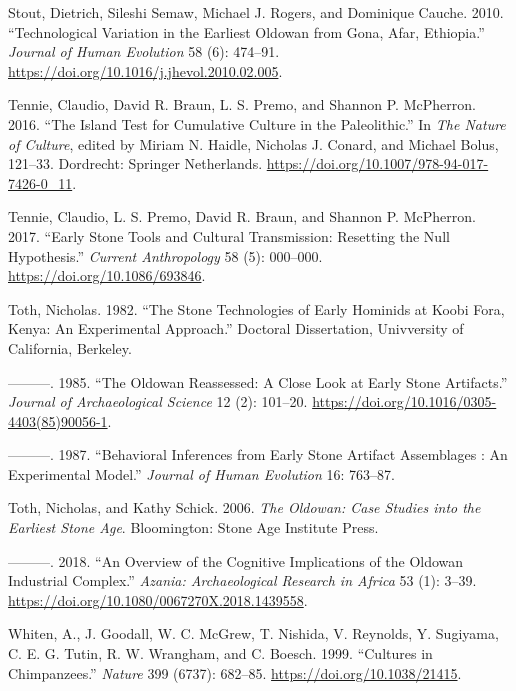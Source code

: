 \documentclass[]{elsarticle} %
\begin{document}
\leavevmode\hypertarget{ref-stoutTechnologicalVariationEarliest2010}{}%
Stout, Dietrich, Sileshi Semaw, Michael J. Rogers, and Dominique Cauche.
2010. ``Technological Variation in the Earliest Oldowan from Gona, Afar,
Ethiopia.'' \emph{Journal of Human Evolution} 58 (6): 474--91.
\url{https://doi.org/10.1016/j.jhevol.2010.02.005}.

\leavevmode\hypertarget{ref-tennieIslandTestCumulative2016}{}%
Tennie, Claudio, David R. Braun, L. S. Premo, and Shannon P. McPherron.
2016. ``The Island Test for Cumulative Culture in the Paleolithic.'' In
\emph{The Nature of Culture}, edited by Miriam N. Haidle, Nicholas J.
Conard, and Michael Bolus, 121--33. Dordrecht: Springer Netherlands.
\url{https://doi.org/10.1007/978-94-017-7426-0_11}.

\leavevmode\hypertarget{ref-tennieEarlyStoneTools2017}{}%
Tennie, Claudio, L. S. Premo, David R. Braun, and Shannon P. McPherron.
2017. ``Early Stone Tools and Cultural Transmission: Resetting the Null
Hypothesis.'' \emph{Current Anthropology} 58 (5): 000--000.
\url{https://doi.org/10.1086/693846}.

\leavevmode\hypertarget{ref-tothStoneTechnologiesEarly1982}{}%
Toth, Nicholas. 1982. ``The Stone Technologies of Early Hominids at
Koobi Fora, Kenya: An Experimental Approach.'' Doctoral Dissertation,
Univversity of California, Berkeley.

\leavevmode\hypertarget{ref-tothOldowanReassessedClose1985}{}%
---------. 1985. ``The Oldowan Reassessed: A Close Look at Early Stone
Artifacts.'' \emph{Journal of Archaeological Science} 12 (2): 101--20.
\url{https://doi.org/10.1016/0305-4403(85)90056-1}.

\leavevmode\hypertarget{ref-tothBehavioralInferencesEarly1987}{}%
---------. 1987. ``Behavioral Inferences from Early Stone Artifact
Assemblages : An Experimental Model.'' \emph{Journal of Human Evolution}
16: 763--87.

\leavevmode\hypertarget{ref-tothOldowanCaseStudies2006}{}%
Toth, Nicholas, and Kathy Schick. 2006. \emph{The Oldowan: Case Studies
into the Earliest Stone Age}. Bloomington: Stone Age Institute Press.

\leavevmode\hypertarget{ref-tothOverviewCognitiveImplications2018}{}%
---------. 2018. ``An Overview of the Cognitive Implications of the
Oldowan Industrial Complex.'' \emph{Azania: Archaeological Research in
Africa} 53 (1): 3--39.
\url{https://doi.org/10.1080/0067270X.2018.1439558}.

\leavevmode\hypertarget{ref-whitenCulturesChimpanzees1999}{}%
Whiten, A., J. Goodall, W. C. McGrew, T. Nishida, V. Reynolds, Y.
Sugiyama, C. E. G. Tutin, R. W. Wrangham, and C. Boesch. 1999.
``Cultures in Chimpanzees.'' \emph{Nature} 399 (6737): 682--85.
\url{https://doi.org/10.1038/21415}.
\end{document}
